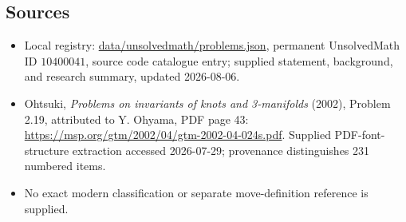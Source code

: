 \documentclass[11pt]{article}
\begin{document}
\subsection{Sources}
\begin{itemize}
\item Local registry: \url{data/unsolvedmath/problems.json}, permanent UnsolvedMath ID \(10400041\), source code catalogue entry; supplied statement, background, and research summary, updated 2026-08-06.
\item Ohtsuki, \emph{Problems on invariants of knots and 3-manifolds} (2002), Problem 2.19, attributed to Y. Ohyama, PDF page 43: \url{https://msp.org/gtm/2002/04/gtm-2002-04-024s.pdf}. Supplied PDF-font-structure extraction accessed 2026-07-29; provenance distinguishes 231 numbered items.
\item No exact modern classification or separate move-definition reference is supplied.
\end{itemize}
\end{document}
